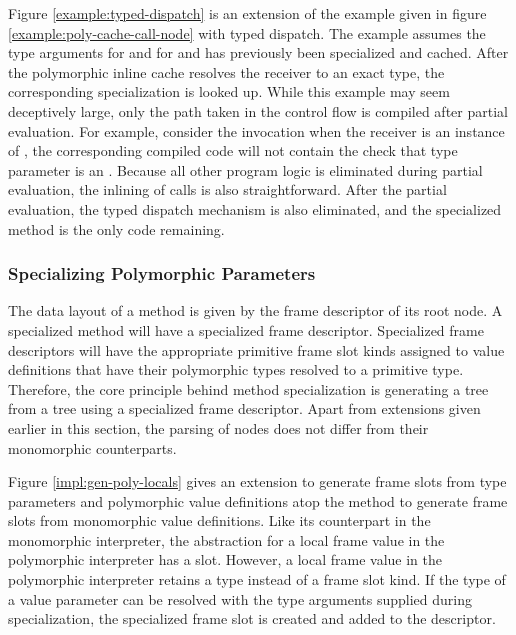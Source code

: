 Figure \ref{example:typed-dispatch} is an extension of the example given in figure \ref{example:poly-cache-call-node} with typed dispatch.
The example assumes the type arguments for  and  for  and  has previously been specialized and cached.
After the polymorphic inline cache resolves the receiver to an exact type, the corresponding specialization is looked up.
While this example may seem deceptively large, only the path taken in the control flow is compiled after partial evaluation.
For example, consider the invocation  when the receiver is an instance of , the corresponding compiled code will not contain the check that type parameter is an .
Because all other program logic is eliminated during partial evaluation, the inlining of calls is also straightforward.
After the partial evaluation, the typed dispatch mechanism is also eliminated, and the specialized method is the only code remaining.

\subsubsection*{Specializing Polymorphic Parameters}

The data layout of a method is given by the frame descriptor of its root node.
A specialized method will have a specialized frame descriptor.
Specialized frame descriptors will have the appropriate primitive frame slot kinds assigned to value definitions that have their polymorphic types resolved to a primitive type.
Therefore, the core principle behind method specialization is generating a  tree from a  tree using a specialized frame descriptor.
Apart from extensions given earlier in this section, the parsing of  nodes does not differ from their monomorphic counterparts.

Figure \ref{impl:gen-poly-locals} gives an extension to generate frame slots from type parameters and polymorphic value definitions atop the method to generate frame slots from monomorphic value definitions.
Like its counterpart in the monomorphic interpreter, the abstraction for a local frame value in the polymorphic interpreter has a slot.
However, a local frame value in the polymorphic interpreter retains a type instead of a frame slot kind.
If the type of a value parameter can be resolved with the type arguments supplied during specialization, the specialized frame slot is created and added to the descriptor.

